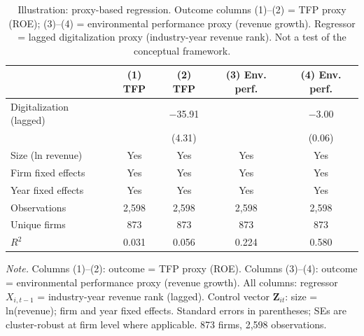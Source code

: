 \documentclass[3p,times,sort&compress]{elsarticle}
\begin{document}
\begin{table}[t!]
  \centering
  \caption{Illustration: proxy-based regression. Outcome columns (1)--(2) = TFP proxy (ROE); (3)--(4) = environmental performance proxy (revenue growth). Regressor = lagged digitalization proxy (industry-year revenue rank). Not a test of the conceptual framework.}
  \label{tab:regression}
  \small
  \begin{tabularx}{\textwidth}{@{}>{\raggedright\arraybackslash}X c c c c@{}}
    \toprule
    & (1) TFP & (2) TFP & (3) Env. perf. & (4) Env. perf. \\
    \midrule
    Digitalization (lagged) & & $-$35.91 & & $-$3.00 \\
    & & (4.31) & & (0.06) \\
    Size (ln revenue) & Yes & Yes & Yes & Yes \\
    \midrule
    Firm fixed effects & Yes & Yes & Yes & Yes \\
    Year fixed effects & Yes & Yes & Yes & Yes \\
    \midrule
    Observations & 2,598 & 2,598 & 2,598 & 2,598 \\
    Unique firms & 873 & 873 & 873 & 873 \\
    $R^2$ & 0.031 & 0.056 & 0.224 & 0.580 \\
    \bottomrule
  \end{tabularx}
  \vspace{0.5em}
  \parbox{\textwidth}{\raggedright\footnotesize\textit{Note.} Columns (1)--(2): outcome = TFP proxy (ROE). Columns (3)--(4): outcome = environmental performance proxy (revenue growth). All columns: regressor $X_{i,t-1}$ = industry-year revenue rank (lagged). Control vector $\mathbf{Z}_{it}$: size = ln(revenue); firm and year fixed effects. Standard errors in parentheses; SEs are cluster-robust at firm level where applicable. 873 firms, 2,598 observations.}
\end{table}
\end{document}
